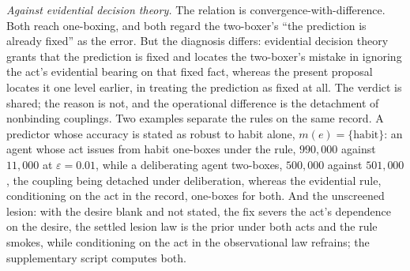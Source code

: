 \textit{Against evidential decision theory.} The relation is convergence-with-difference. Both reach one-boxing, and both regard the two-boxer's ``the prediction is already fixed'' as the error. But the diagnosis differs: evidential decision theory grants that the prediction is fixed and locates the two-boxer's mistake in ignoring the act's evidential bearing on that fixed fact, whereas the present proposal locates it one level earlier, in treating the prediction as fixed at all. The verdict is shared; the reason is not, and the operational difference is the detachment of nonbinding couplings. Two examples separate the rules on the same record. A predictor whose accuracy is stated as robust to habit alone, $m(e) = \{\text{habit}\}$: an agent whose act issues from habit one-boxes under the rule, $990{,}000$ against $11{,}000$ at $\varepsilon = 0.01$, while a deliberating agent two-boxes, $500{,}000$ against $501{,}000$, the coupling being detached under deliberation, whereas the evidential rule, conditioning on the act in the record, one-boxes for both. And the unscreened lesion: with the desire blank and not stated, the fix severs the act's dependence on the desire, the settled lesion law is the prior under both acts and the rule smokes, while conditioning on the act in the observational law refrains; the supplementary script computes both.

